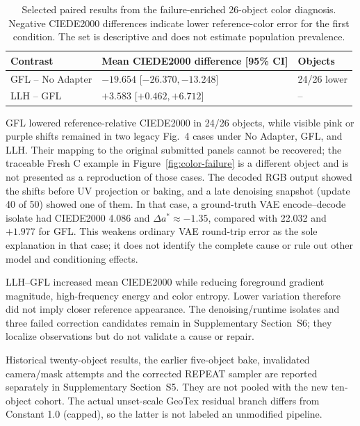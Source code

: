 \documentclass[times,twocolumn,final]{elsarticle}
\begin{document}
\begin{table}[t]
\centering
\scriptsize
\setlength{\tabcolsep}{3pt}
\caption{Selected paired results from the failure-enriched 26-object color diagnosis. Negative CIEDE2000 differences indicate lower reference-color error for the first condition. The set is descriptive and does not estimate population prevalence.}
\label{tab:color-summary}
\begin{tabular}{p{2.3cm}p{3.3cm}p{1.3cm}}
\toprule
Contrast & Mean CIEDE2000 difference [95\% CI] & Objects \\
\midrule
GFL -- No Adapter & $-19.654$ [$-26.370,-13.248$] & 24/26 lower \\
LLH -- GFL & $+3.583$ [$+0.462,+6.712$] & -- \\
\bottomrule
\end{tabular}
\end{table}

GFL lowered reference-relative CIEDE2000 in 24/26 objects, while visible pink or purple shifts remained in two legacy Fig.~4 cases under No Adapter, GFL, and LLH. Their mapping to the original submitted panels cannot be recovered; the traceable Fresh C example in Figure~\ref{fig:color-failure} is a different object and is not presented as a reproduction of those cases. The decoded RGB output showed the shifts before UV projection or baking, and a late denoising snapshot (update 40 of 50) showed one of them. In that case, a ground-truth VAE encode--decode isolate had CIEDE2000 4.086 and $\Delta a^*\approx-1.35$, compared with 22.032 and $+1.977$ for GFL. This weakens ordinary VAE round-trip error as the sole explanation in that case; it does not identify the complete cause or rule out other model and conditioning effects.

LLH--GFL increased mean CIEDE2000 while reducing foreground gradient magnitude, high-frequency energy and color entropy. Lower variation therefore did not imply closer reference appearance. The denoising/runtime isolates and three failed correction candidates remain in Supplementary Section~S6; they localize observations but do not validate a cause or repair.

Historical twenty-object results, the earlier five-object bake, invalidated camera/mask attempts and the corrected REPEAT sampler are reported separately in Supplementary Section~S5. They are not pooled with the new ten-object cohort. The actual unset-scale GeoTex residual branch differs from Constant 1.0 (capped), so the latter is not labeled an unmodified pipeline.
\end{document}
